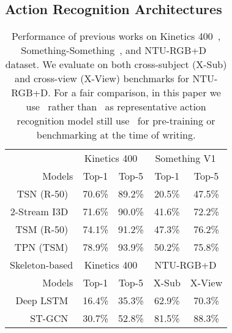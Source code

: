 \documentclass[10pt,twocolumn,letterpaper]{article}
\begin{document}
\subsection{Action Recognition Architectures}
\vspace{-0.3em}
\setlength{\tabcolsep}{4pt}
\begin{table}[t]
\begin{center}
{\small 
        \begin{tabular}{r|c|c|c|c}
            \hline
                   & \multicolumn{2}{c|}{Kinetics 400~\cite{kinetics400}}
                   & \multicolumn{2}{c}{Something V1~\cite{goyal2017something}}\\ 
            Models & Top-1 &  Top-5 & Top-1 & Top-5  \\ 
            \hline 
            TSN (R-50)~\cite{TSN}   & 70.6\% & 89.2\% & 20.5\% & 47.5\% \\
            2-Stream I3D~\cite{i3d} & 71.6\% & 90.0\% & 41.6\% & 72.2\% \\
            TSM (R-50)~\cite{TSM}   & 74.1\% & 91.2\% & 47.3\% & 76.2\% \\
            TPN (TSM)~\cite{TPN}    & 78.9\% & 93.9\% & 50.2\% & 75.8\% \\
            \hline
            \hline Skeleton-based
                   & \multicolumn{2}{c|}{Kinetics 400~\cite{kinetics400}}
                   & \multicolumn{2}{c}{NTU-RGB+D~\cite{nturgbd}}\\ 
            Models & Top-1 &  Top-5 & X-Sub & X-View  \\ 
            \hline
            Deep LSTM~\cite{nturgbd} & 16.4\% & 35.3\% & 62.9\% & 70.3\% \\
            ST-GCN~\cite{stgcn}      & 30.7\% & 52.8\% & 81.5\% & 88.3\% \\
            \hline
        \end{tabular}
}
\end{center}
\vspace{-0.5em}
\caption{Performance of previous works on Kinetics 400~\cite{kinetics400}, Something-Something~\cite{goyal2017something}, and NTU-RGB+D~\cite{nturgbd} dataset.
We evaluate on both cross-subject (X-Sub) and cross-view (X-View) benchmarks for NTU-RGB+D.
For a fair comparison, in this paper we use~\cite{kinetics400} rather than~\cite{kinetics700} as representative action recognition model still use~\cite{kinetics400} for pre-training or benchmarking at the time of writing.   
\vspace{-1em}
\label{table:action_recognition_models}
}
\end{table}
\end{document}
